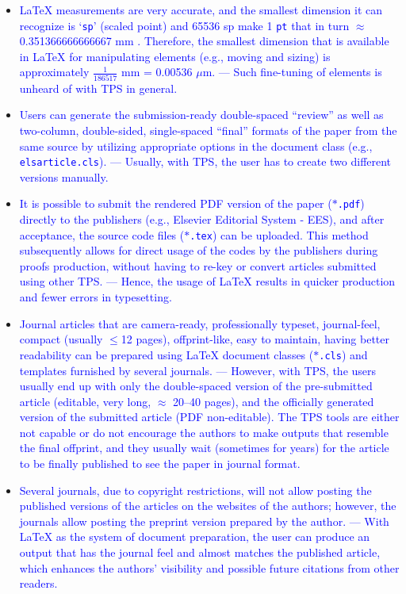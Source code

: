 \documentclass[phd,showframe]{ndsu-thesis-2022}
\newcommand\italk[1]{\textcolor{blue}{#1}}  %
\newcommand\lx{\LaTeX\xspace}
\newcommand\vb[1]{\textcolor{blue}{\texttt{#1}}}%
\begin{document}
\begin{itemize}[leftmargin=*, itemsep=0pt, parsep=3pt]
\item \italk{\lx measurements are very accurate, and the smallest dimension it can recognize is `\vb{sp}' (scaled point) and 65536 sp make 1 \vb{pt} that in turn $\approx$ 0.351366666666667 mm \citep{Wikibook2016}. Therefore, the smallest dimension that is available in \lx for manipulating elements (e.g., moving and sizing) is approximately $\frac{1}{186517}$ mm = 0.00536 $\mu$m. --- Such fine-tuning of elements is unheard of with TPS in general.} 

\item \italk{Users can generate the submission-ready double-spaced ``review'' as well as two-column, double-sided, single-spaced ``final'' formats of the paper from the same source by utilizing appropriate options in the document class (e.g., \vb{elsarticle.cls}). --- Usually, with TPS, the user has to create two different versions manually.}   

\item \italk{It is possible to submit the rendered PDF version of the paper ($\ast$\vb{.pdf}) directly to the publishers (e.g., Elsevier Editorial System - EES), and after acceptance, the source code files ($\ast$\vb{.tex}) can be uploaded.  This method subsequently allows for direct usage of the codes by the publishers during proofs production, without having to re-key or convert articles submitted using other TPS. --- Hence, the usage of \lx results in quicker production and fewer errors in typesetting.}   

\item \italk{Journal articles that are camera-ready, professionally typeset, journal-feel, compact (usually $\le$12 pages), offprint-like, easy to maintain, having better readability can be prepared using \lx document classes ($\ast$\vb{.cls}) and templates furnished by several journals. --- However, with TPS, the users usually end up with only the double-spaced version of the pre-submitted article (editable, very long, $\approx$ 20--40 pages), and the officially generated version of the submitted article (PDF non-editable). The TPS tools are either not capable or do not encourage the authors to make outputs that resemble the final offprint, and they usually wait (sometimes for years) for the article to be finally published to see the paper in journal format.}    

\item \italk{Several journals, due to copyright restrictions, will not allow posting the published versions of the articles on the websites of the authors; however, the journals allow posting the preprint version prepared by the author. --- With \lx as the system of document preparation, the user can produce an output that has the journal feel and almost matches the published article, which enhances the authors' visibility and possible future citations from other readers.}  


\end{itemize}
\end{document}
